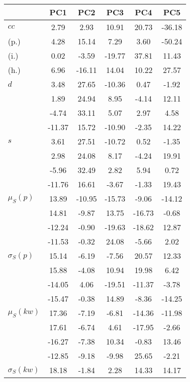 \begin{table}[h!]
\begin{center}
\begin{tabular}{| l | c | c | c | c | c |}\hline
 & PC1 & PC2 & PC3 & PC4 & PC5 \\\hline
$cc$ & 2.79  & 2.93  & 10.91  & 20.73  & -36.18 \\\hline
(p.) & 4.28  & 15.14  & 7.29  & 3.60  & -50.24 \\\hline
(i.) & 0.02  & -3.59  & -19.77  & 37.81  & 11.43 \\\hline
(h.) & 6.96  & -16.11  & 14.04  & 10.22  & 27.57 \\\hline
$d$ & 3.48  & 27.65  & -10.36  & 0.47  & -1.92 \\\hline
 & 1.89  & 24.94  & 8.95  & -4.14  & 12.11 \\\hline
 & -4.74  & 33.11  & 5.07  & 2.97  & 4.58 \\\hline
 & -11.37  & 15.72  & -10.90  & -2.35  & 14.22 \\\hline
$s$ & 3.61  & 27.51  & -10.72  & 0.52  & -1.35 \\\hline
 & 2.98  & 24.08  & 8.17  & -4.24  & 19.91 \\\hline
 & -5.96  & 32.49  & 2.82  & 5.94  & 0.72 \\\hline
 & -11.76  & 16.61  & -3.67  & -1.33  & 19.43 \\\hline
$\mu_S(p)$ & 13.89  & -10.95  & -15.73  & -9.06  & -14.12 \\\hline
 & 14.81  & -9.87  & 13.75  & -16.73  & -0.68 \\\hline
 & -12.24  & -0.90  & -19.63  & -18.62  & 12.87 \\\hline
 & -11.53  & -0.32  & 24.08  & -5.66  & 2.02 \\\hline
$\sigma_S(p)$ & 15.14  & -6.19  & -7.56  & 20.57  & 12.33 \\\hline
 & 15.88  & -4.08  & 10.94  & 19.98  & 6.42 \\\hline
 & -14.05  & 4.06  & -19.51  & -11.37  & -3.78 \\\hline
 & -15.47  & -0.38  & 14.89  & -8.36  & -14.25 \\\hline
$\mu_S(kw)$ & 17.36  & -7.19  & -6.81  & -14.36  & -11.98 \\\hline
 & 17.61  & -6.74  & 4.61  & -17.95  & -2.66 \\\hline
 & -16.27  & -7.38  & 10.34  & -0.83  & 13.46 \\\hline
 & -12.85  & -9.18  & -9.98  & 25.65  & -2.21 \\\hline
$\sigma_S(kw)$ & 18.18  & -1.84  & 2.28  & 14.33  & 14.17 \\\hline

\end{tabular}
\end{center}
\end{table}
